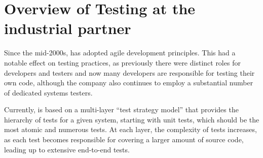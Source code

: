 \section{Overview of Testing at the industrial partner}\label{sec:ind_overview}

%

%
%

Since the mid-2000s,  has adopted agile development principles.
This had a notable effect on testing practices, as previously there were distinct roles for developers and testers and now many developers are responsible for testing their own code, although the company also continues to employ a substantial number of dedicated systems testers.

Currently,  is based on a multi-layer ``test strategy model'' that provides the hierarchy of tests for a given system, starting with unit tests, which should be the most atomic and numerous tests.
At each layer, the complexity of tests increases, as each test becomes responsible for covering a larger amount of source code, leading up to extensive end-to-end tests.

